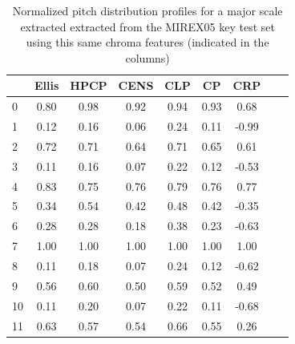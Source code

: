 \documentclass{article}
\begin{document}
\begin{table}
 \begin{center}
 \begin{tabular}{|l|c|c|c|c|c|c|c|c|}
   \hline
  			&	Ellis	&	HPCP		&	CENS		&	CLP		&	CP		&	CRP		\\
  \hline
  	0		&	0.80		&	0.98		&	0.92		&	0.94		&	0.93		&	0.68		\\
  	1		&	0.12		&	0.16		&	0.06		&	0.24		&	0.11		&	-0.99	\\
  	2		&	0.72		&	0.71		&	0.64		&	0.71		&	0.65 	&	0.61		\\
  	3		&	0.11		&	0.16		&	0.07		&	0.22		&	0.12 	&	-0.53	\\
  	4		&	0.83		&	0.75		&	0.76		&	0.79		&	0.76  	&	0.77		\\
  	5		&	0.34		&	0.54		&	0.42		&	0.48		&	0.42  	&	-0.35	\\
  	6		&	0.28		&	0.28		&	0.18		&	0.38		&	0.23  	&	-0.63	\\
  	7		&	1.00		&	1.00		&	1.00		&	1.00		&	1.00  	&	1.00		\\
  	8		&	0.11		&	0.18		&	0.07		&	0.24		&	0.12  	&	-0.62	\\
  	9		&	0.56		&	0.60		&	0.50		&	0.59		&	0.52  	&	0.49		\\
  	10		&	0.11		&	0.20		&	0.07		&	0.22		&	0.11  	&	-0.68	\\
  	11		&	0.63		&	0.57		&	0.54		&	0.66		&	0.55  	&	0.26		\\
  \hline
 \end{tabular}
\end{center}
 \caption{Normalized pitch distribution profiles for a major scale extracted extracted from the MIREX05 key test set using this same chroma features (indicated in the columns)}
 \label{tab:extracted_profiles_M}
\end{table}
\end{document}
